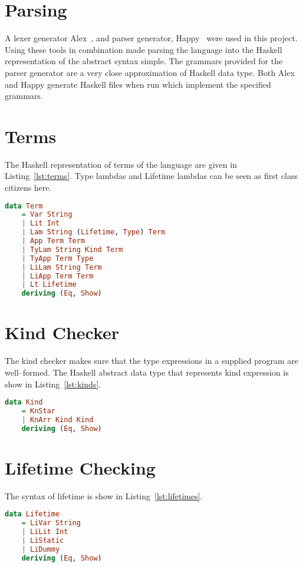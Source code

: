 \section{Parsing}
A lexer generator Alex~\cite{alex}, and parser generator, Happy~\cite{happy}
were used in this project. Using these tools in combination made parsing the
language into the Haskell representation of the abstract syntax simple.  The
grammars provided for the parser generator are a very close approximation of
Haskell data type. Both Alex and Happy generate Haskell files when run which
implement the specified grammars.

\section{Terms}
The Haskell representation of terms of the language are given in
Listing~\ref{lst:terms}.  Type lambdas and Lifetime lambdas can be seen as
first class citizens here.

\begin{lstlisting}[caption=Haskell representation of Terms., language=Haskell, label={lst:terms}]
data Term
    = Var String
    | Lit Int
    | Lam String (Lifetime, Type) Term
    | App Term Term
    | TyLam String Kind Term 
    | TyApp Term Type
    | LiLam String Term
    | LiApp Term Term
    | Lt Lifetime
    deriving (Eq, Show)
\end{lstlisting}

\section{Kind Checker}
The kind checker makes sure that the type expressions in a supplied program are
well--formed. The Haskell abstract data type that represents kind expression is
show in Listing~\ref{lst:kinds}.

\begin{lstlisting}[caption=Haskell representation of Kinds., language=Haskell, label={lst:kinds}]
data Kind
    = KnStar
    | KnArr Kind Kind
    deriving (Eq, Show)
\end{lstlisting}

\section{Lifetime Checking}
The syntax of lifetime is show in Listing~\ref{lst:lifetimes}. 

\begin{lstlisting}[caption=Haskell representation of Lifetimes.., language=Haskell, label={lst:lifetimes}]
data Lifetime 
    = LiVar String
    | LiLit Int
    | LiStatic
    | LiDummy
    deriving (Eq, Show)
\end{lstlisting}

